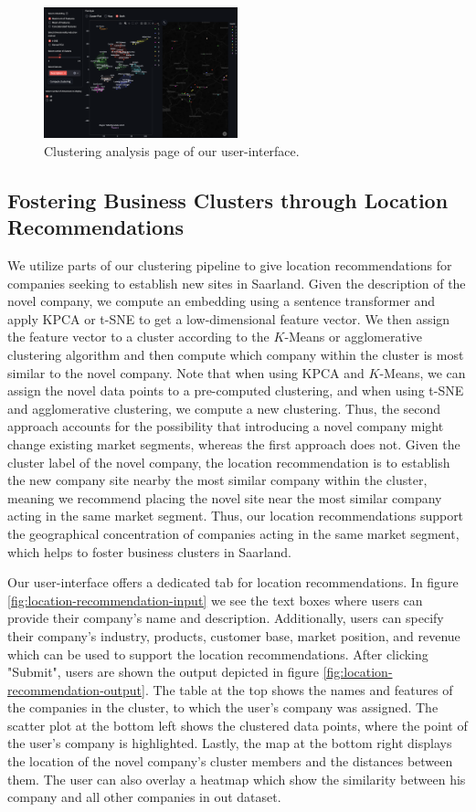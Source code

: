 \documentclass[conference]{IEEEtran}
\begin{document}
\begin{figure}[H]
	\centering
	\includegraphics[width=0.5\textwidth]{figures/clustering_analysis.png}
	\caption{Clustering analysis page of our user-interface.}
	\label{fig:clustering-analysis}
\end{figure}

\subsection{Fostering Business Clusters through Location Recommendations}
We utilize parts of our clustering pipeline to give location recommendations for companies seeking to establish new sites in Saarland. Given the description of the novel company, we compute an embedding using a sentence transformer and apply KPCA or t-SNE to get a low-dimensional feature vector. We then assign the feature vector to a cluster according to the $K$-Means or agglomerative clustering algorithm and then compute which company within the cluster is most similar to the novel company. Note that when using KPCA and $K$-Means, we can assign the novel data points to a pre-computed clustering, and when using t-SNE and agglomerative clustering, we compute a new clustering.
Thus, the second approach accounts for the possibility that introducing a novel company might change existing market segments, whereas the first approach does not.
Given the cluster label of the novel company, the location recommendation is to establish the new company site nearby the most similar company within the cluster, meaning we recommend placing the novel site near the most similar company acting in the same market segment. Thus, our location recommendations support the geographical concentration of companies acting in the same market segment, which helps to foster business clusters in Saarland.

Our user-interface offers a dedicated tab for location recommendations. In figure \ref{fig:location-recommendation-input} we see the text boxes where users can provide their company's name and description. Additionally, users can specify their company's industry, products, customer base, market position, and revenue which can be used to support the location recommendations. After clicking "Submit", users are shown the output depicted in figure \ref{fig:location-recommendation-output}. The table at the top shows the names and features of the companies in the cluster, to which the user's company was assigned. The scatter plot at the bottom left shows the clustered data points, where the point of the user's company is highlighted. Lastly, the map at the bottom right displays the location of the novel company's cluster members and the distances between them. The user can also overlay a heatmap which show the similarity between his company and all other companies in out dataset.
\end{document}
